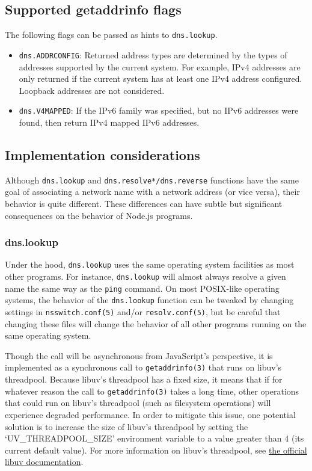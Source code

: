 \subsection{Supported getaddrinfo
flags}\label{supported-getaddrinfo-flags}

The following flags can be passed as hints to \texttt{dns.lookup}.

\begin{itemize}
\itemsep1pt\parskip0pt
\item
  \texttt{dns.ADDRCONFIG}: Returned address types are determined by the
  types of addresses supported by the current system. For example, IPv4
  addresses are only returned if the current system has at least one
  IPv4 address configured. Loopback addresses are not considered.
\item
  \texttt{dns.V4MAPPED}: If the IPv6 family was specified, but no IPv6
  addresses were found, then return IPv4 mapped IPv6 addresses.
\end{itemize}

\subsection{Implementation
considerations}\label{implementation-considerations}

Although \texttt{dns.lookup} and \texttt{dns.resolve*/dns.reverse}
functions have the same goal of associating a network name with a
network address (or vice versa), their behavior is quite different.
These differences can have subtle but significant consequences on the
behavior of Node.js programs.

\subsubsection{dns.lookup}\label{dns.lookup}

Under the hood, \texttt{dns.lookup} uses the same operating system
facilities as most other programs. For instance, \texttt{dns.lookup}
will almost always resolve a given name the same way as the
\texttt{ping} command. On most POSIX-like operating systems, the
behavior of the \texttt{dns.lookup} function can be tweaked by changing
settings in \texttt{nsswitch.conf(5)} and/or \texttt{resolv.conf(5)},
but be careful that changing these files will change the behavior of all
other programs running on the same operating system.

Though the call will be asynchronous from JavaScript's perspective, it
is implemented as a synchronous call to \texttt{getaddrinfo(3)} that
runs on libuv's threadpool. Because libuv's threadpool has a fixed size,
it means that if for whatever reason the call to \texttt{getaddrinfo(3)}
takes a long time, other operations that could run on libuv's threadpool
(such as filesystem operations) will experience degraded performance. In
order to mitigate this issue, one potential solution is to increase the
size of libuv's threadpool by setting the `UV\_THREADPOOL\_SIZE'
environment variable to a value greater than 4 (its current default
value). For more information on libuv's threadpool, see
\href{http://docs.libuv.org/en/latest/threadpool.html}{the official
libuv documentation}.

